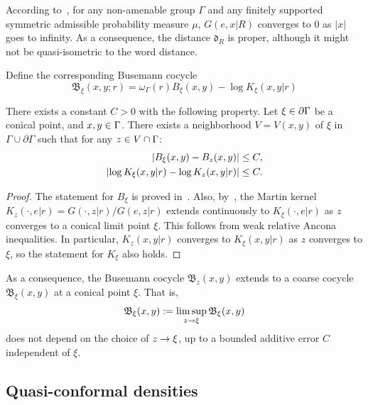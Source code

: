 \documentclass[AHL,Unicode,longabstracts]{cedram}
\newcommand{\pG}{\partial{\Gamma}}
\newcommand{\fkd}{\mathfrak{d}}
\newcommand{\fkB}{\mathfrak{B}}
\let\originalleft\left
\let\originalright\right
\renewcommand{\left}{\mathopen{}\mathclose\bgroup\originalleft}
\renewcommand{\right}{\aftergroup\egroup\originalright}
\let\oldin\in
\renewcommand{\in}{\mathchoice{\oldin}{\oldin}{\,\oldin\,}{\,\oldin\,}}
\let\oldle\le
\renewcommand{\le}{\mathchoice{\oldle}{\oldle}{\,\oldle\,}{\,\oldle\,}}
\renewcommand*{\to}{\mathchoice{\longrightarrow}{\rightarrow}{\rightarrow}{\rightarrow}}
\begin{document}
\begin{rema}
According to~\cite[Lemma~2.1]{GouezelLalley}, for any non-amenable group $\Gamma$ and any finitely supported symmetric admissible probability measure $\mu$, $G(e,x|R)$ converges to 0 as $|x|$ goes to infinity. As a consequence, the distance $\fkd_R$ is proper, although it might not be quasi-isometric to the word distance.
\end{rema}

Define the corresponding Busemann cocycle
\begin{equation}\label{defBusemann}
\fkB_\xi(x, y;r) = \omega_\Gamma(r)B_\xi(x, y)-\log K_\xi(x,y|r)
\end{equation}



\begin{lemm}\label{BusemanEstLem}
There exists a constant $C>0$ with the following property. Let $\xi \in \pG$ be a conical point, and $x, y \in \Gamma$. There exists a neighborhood $V=V(x,y)$ of $\xi$ in $\Gamma\cup\pG$ such that for any $ z \in V \cap \Gamma$:
\begin{align*}
\left\lvert B_\xi(x, y)-B_z(x, y)\right| &\le C, \\
\left\lvert \log K_{\xi}(x, y|r)-\log K_{z}(x, y|r)\right| &\le C.
\end{align*}
\end{lemm}

\begin{proof}
The statement for $B_\xi$ is proved in~\cite[Lemma~2.20]{YangPS}. Also, by~\cite[Proposition~4.1]{DG21}, the Martin kernel $K_z(\cdot,e|r)=G(\cdot, z|r)/G(e, z|r)$ extends continuously to $K_\xi(\cdot,e|r)$ as $z$ converges to a conical limit point $\xi$. This follows from weak relative Ancona inequalities. In particular, $K_z(x,y|r)$ converges to $K_\xi(x,y|r)$ as $z$ converges to $\xi$, so the statement for $K_\xi$ also holds.
\end{proof}

As a consequence, the Busemann cocycle $\fkB_z(x,y)$ extends to a coarse cocycle $\fkB_\xi(x,y)$ at a conical point $\xi$. That is,
\[
\fkB_\xi(x,y) := \limsup_{z\to \xi} \fkB_\xi(x,y)
\]
does not depend on the choice of $z\to \xi$, up to a bounded additive error $C$ independent of $\xi$.

\subsection{Quasi-conformal densities}
\end{document}
